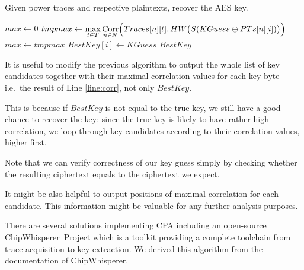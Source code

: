 	\begin{alg}
	\label{alg:cpa}
	Given power traces and respective plaintexts, recover the AES key.
		\begin{algorithmic}[1]
					\State $max \gets 0$
						\State $tmpmax \gets \max\limits_{t\in T} \operatorname*{Corr}\limits_{n\in N}\Bigl(Traces[n][t], HW\bigl(S(KGuess\oplus PTs[n][i])\bigr)\Bigr)$
							\label{line:corr}
							\State $max \gets tmpmax$
							\State $BestKey[i] \gets KGuess$
						\EndIf
					\EndFor
				\EndFor
				\State\Return $BestKey$
			\EndFunction
		\end{algorithmic}
	\end{alg}
	
	\begin{note}
	\label{note:fulllist}
		It is useful to modify the previous algorithm to output the whole list of key candidates together with their maximal correlation values for each key byte i.e.\ the result of Line \ref{line:corr}, not only $BestKey$.
		
		This is because if $BestKey$ is not equal to the true key, we still have a good chance to recover the key: since the true key is likely to have rather high correlation, we loop through key candidates according to their correlation values, higher first.
		
		Note that we can verify correctness of our key guess simply by checking whether the resulting ciphertext equals to the ciphertext we expect.
	\end{note}
	
	\begin{note}
	\label{note:leakpos}
		It might be also helpful to output positions of maximal correlation for each candidate. This information might be valuable for any further analysis purposes.
	\end{note}
	
	There are several solutions implementing CPA including an open-source ChipWhisperer\texttrademark\ Project \cite{chipwhisperer} which is a toolkit providing a complete toolchain from trace acquisition to key extraction. We derived this algorithm from the documentation of ChipWhisperer\texttrademark.



